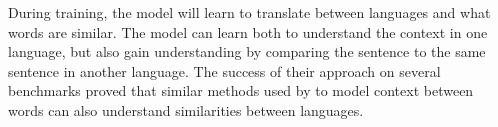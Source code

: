 \documentclass[nofilelist]{cslthse-msc}
\begin{document}
During training, the model will learn to translate between languages and what words are similar. The model can learn both to understand the context in one language, but also gain understanding by comparing the sentence to the same sentence in another language. The success of their approach on several benchmarks proved that similar methods used by \citet{DBLP:journals/corr/abs-1810-04805} to model context between words can also understand similarities between languages.




\end{document}
